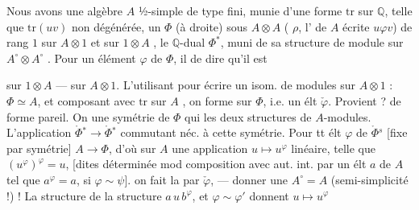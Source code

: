 \documentclass[11pt,a4paper]{article}
\begin{document}
Nous avons une algèbre $A$ ½-simple de type fini, munie d'une forme
$\mathrm{tr}$ sur $\mathbb{Q}$, telle que $\mathrm{tr}(uv)$ non dégénérée,
un  $\Phi$ (à droite) sous $A \otimes A$ (\ill{} $\rho$,
l' \ill{} de $A$ écrite $u\varphi v$)
 de rang $1$ sur $A \otimes 1$ et sur $1 \otimes A$
, le $\mathbb{Q}$-dual $\Phi^{*}$,
\struck{\ill{}} muni de sa structure de module sur
$A^{\circ} \otimes A^{\circ}$ . Pour un élément
$\varphi$ de $\Phi$, il \ill{} de dire qu'il est 
\ill{} \struck{\ill{}}

\struck{\ill{}}
sur $1 \otimes A$ — sur $A \otimes 1$. L'utilisant pour écrire un isom. de
modules sur $A \otimes 1$ : $\Phi \simeq A$, et 
composant avec $\mathrm{tr}$ sur $A$ , on
 forme sur $\Phi$, i.e. un élt \ill{}
$\check\varphi$. Provient ? \ill{} de forme pareil. On 
 une symétrie de $\Phi$ qui  les
deux structures de $A$-modules. L'application
$\mathring{\Phi}{}^{*} \to \mathring{\Phi}{}^{*}$ commutant néc. à cette
symétrie. Pour tt élt $\varphi$ de $\mathring{\Phi}{}^{s}$ [fixe par
symétrie]  
$A \to \Phi$, d'où sur $A$ une  application
$u \mapsto u^{\varphi}$ linéaire, telle que $(u^{\varphi})^{\varphi} = u$,
[dites \ill{} déterminée mod  composition avec aut.
int. par un élt $a$ de $A$ tel que $a^{\varphi} = a$, si
$\varphi \sim \psi$].  on fait la \ill{} par
$\check\varphi$, — donner une \ill{} $A^{\circ} = A$ (semi-simplicité !)
\ill{} ! La structure de  \ill{} la structure
$a\,u\,b^{\varphi}$, et $\varphi \sim \varphi'$ donnent
$u \mapsto u^{\varphi}$ \ill{}

\end{document}
